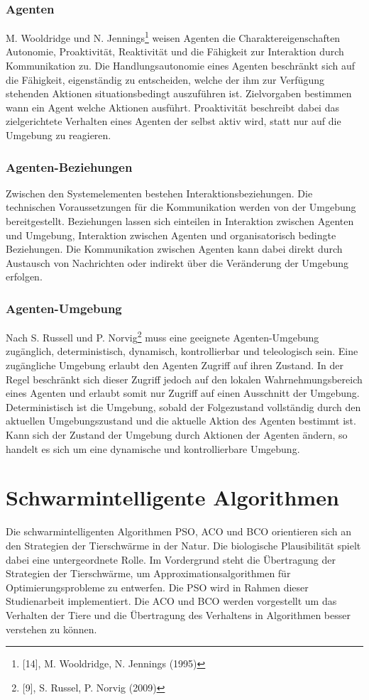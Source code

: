 \documentclass[a4paper, 11pt]{article}
\begin{document}
\subsubsection{Agenten} 
M. Wooldridge und N. Jennings\footnote{[14], M. Wooldridge, N. Jennings (1995)} weisen Agenten die Charaktereigenschaften Autonomie, Proaktivität, Reaktivität und die Fähigkeit zur Interaktion durch Kommunikation zu. Die Handlungsautonomie eines Agenten beschränkt sich auf die Fähigkeit, eigenständig zu entscheiden, welche der ihm zur Verfügung stehenden Aktionen situationsbedingt auszuführen ist. Zielvorgaben bestimmen wann ein Agent welche Aktionen ausführt. Proaktivität beschreibt dabei das zielgerichtete Verhalten eines Agenten der selbst aktiv wird, statt nur auf die Umgebung zu reagieren.\newline
\subsubsection{Agenten-Beziehungen}
Zwischen den Systemelementen bestehen Interaktionsbeziehungen. Die technischen Voraussetzungen für die Kommunikation werden von der Umgebung bereitgestellt. Beziehungen lassen sich einteilen in Interaktion zwischen Agenten und Umgebung, Interaktion zwischen Agenten und organisatorisch bedingte Beziehungen. Die Kommunikation zwischen Agenten kann dabei direkt durch Austausch von Nachrichten oder indirekt über die Veränderung der Umgebung erfolgen.\newline
\subsubsection{Agenten-Umgebung}
Nach S. Russell und P. Norvig\footnote{[9], S. Russel, P. Norvig (2009)} muss eine geeignete Agenten-Umgebung zugänglich, deterministisch, dynamisch, kontrollierbar und teleologisch sein. Eine zugängliche Umgebung erlaubt den Agenten Zugriff auf ihren Zustand. In der Regel beschränkt sich dieser Zugriff jedoch auf den lokalen Wahrnehmungsbereich eines Agenten und erlaubt somit nur Zugriff auf einen Ausschnitt der Umgebung. Deterministisch ist die Umgebung, sobald der Folgezustand vollständig durch den aktuellen Umgebungszustand und die aktuelle Aktion des Agenten bestimmt ist. Kann sich der Zustand der Umgebung durch Aktionen der Agenten ändern, so handelt es sich um eine dynamische und kontrollierbare Umgebung.
\newpage
\section{Schwarmintelligente Algorithmen}
Die schwarmintelligenten Algorithmen \ac{PSO}, \ac{ACO} und \ac{BCO} orientieren sich an den Strategien der Tierschwärme in der Natur. Die biologische Plausibilität spielt dabei eine untergeordnete Rolle. Im Vordergrund steht die Übertragung der Strategien der Tierschwärme, um Approximationsalgorithmen für Optimierungsprobleme zu entwerfen. Die \acs{PSO} wird in Rahmen dieser Studienarbeit implementiert. Die \acs{ACO} und \acs{BCO} werden vorgestellt um das Verhalten der Tiere und die Übertragung des Verhaltens in Algorithmen besser verstehen zu können.
\end{document}
